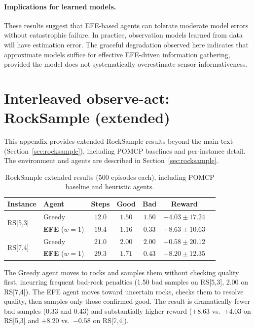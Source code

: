 \documentclass[runningheads]{llncs}
\begin{document}
\paragraph{Implications for learned models.} These results suggest that EFE-based agents can tolerate moderate model errors without catastrophic failure. In practice, observation models learned from data will have estimation error. The graceful degradation observed here indicates that approximate models suffice for effective EFE-driven information gathering, provided the model does not systematically overestimate sensor informativeness.

\section{Interleaved observe-act: RockSample (extended)}
\label{app:rocksample}

This appendix provides extended RockSample results beyond the main text (Section~\ref{sec:rocksample}), including POMCP baselines and per-instance detail. The environment and agents are described in Section~\ref{sec:rocksample}.

\begin{table}[h]
\centering
\caption{RockSample extended results (500 episodes each), including POMCP baseline and heuristic agents.}
\label{tab:rocksample_extended}
\begin{small}
\begin{tabular}{llccccc}
\toprule
Instance & Agent & Steps & Good & Bad & Reward \\
\midrule
\multirow{2}{*}{RS[5,3]} & Greedy & $12.0$ & $1.50$ & $1.50$ & $+4.03 \pm 17.24$ \\
& \textbf{EFE} ($w{=}1$) & $19.4$ & $1.16$ & $\mathbf{0.33}$ & $\mathbf{+8.63 \pm 10.63}$ \\
\midrule
\multirow{2}{*}{RS[7,4]} & Greedy & $21.0$ & $2.00$ & $2.00$ & $-0.58 \pm 20.12$ \\
& \textbf{EFE} ($w{=}1$) & $29.3$ & $1.71$ & $\mathbf{0.43}$ & $\mathbf{+8.20 \pm 12.35}$ \\
\bottomrule
\end{tabular}
\end{small}
\end{table}

The Greedy agent moves to rocks and samples them without checking quality first, incurring frequent bad-rock penalties (1.50 bad samples on RS[5,3], 2.00 on RS[7,4]). The EFE agent moves toward uncertain rocks, checks them to resolve quality, then samples only those confirmed good. The result is dramatically fewer bad samples ($0.33$ and $0.43$) and substantially higher reward ($+8.63$ vs.\ $+4.03$ on RS[5,3] and $+8.20$ vs.\ $-0.58$ on RS[7,4]).
\end{document}
